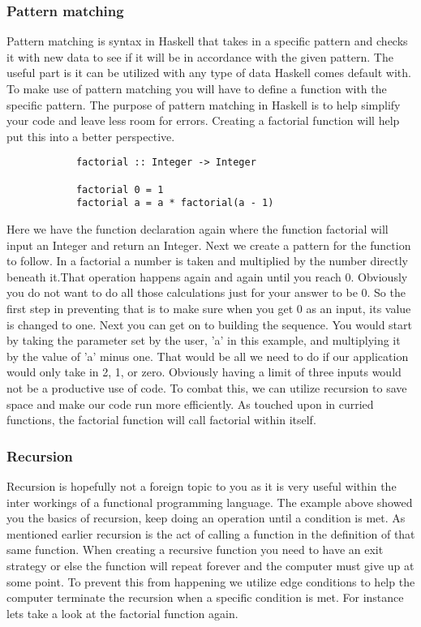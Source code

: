 \documentclass{article}
\begin{document}
        \subsubsection{Pattern matching}
        Pattern matching is syntax in Haskell that takes in a specific pattern and checks it with new data to see if it will be in accordance with the given pattern. The useful part is it can be utilized with any type of data Haskell comes default with. To make use of pattern matching you will have to define a function with the specific pattern. The purpose of pattern matching in Haskell is to help simplify your code and leave less room for errors. Creating a factorial function will help put this into a better perspective. 
        
        \begin{lstlisting}
            factorial :: Integer -> Integer 
            
            factorial 0 = 1
            factorial a = a * factorial(a - 1)
        \end{lstlisting}
        
        \noindent Here we have the function declaration again where the function factorial will input an Integer and return an Integer. Next we create a pattern for the function to follow. In a factorial a number is taken and multiplied by the number directly beneath it.That operation happens again and again until you reach 0. Obviously you do not want to do all those calculations just for your answer to be 0. So the first step in preventing that is to make sure when you get 0 as an input, its value is changed to one. Next you can get on to building the sequence. You would start by taking the parameter set by the user, 'a' in this example, and multiplying it by the value of 'a' minus one. That would be all we need to do if our application would only take in 2, 1, or zero. Obviously having a limit of three inputs would not be a productive use of code. To combat this, we can utilize recursion to save space and make our code run more efficiently. As touched upon in curried functions, the factorial function will call factorial within itself. 
        
        \subsubsection{Recursion}
        Recursion is hopefully not a foreign topic to you as it is very useful within the inter workings of a functional programming language. The example above showed you the basics of recursion, keep doing an operation until a condition is met. As mentioned earlier recursion is the act of calling a function in the definition of that same function. When creating a recursive function you need to have an exit strategy or else the function will repeat forever and the computer must give up at some point. To prevent this from happening we utilize edge conditions to help the computer terminate the recursion when a specific condition is met. For instance lets take a look at the factorial function again.
        
\end{document}
